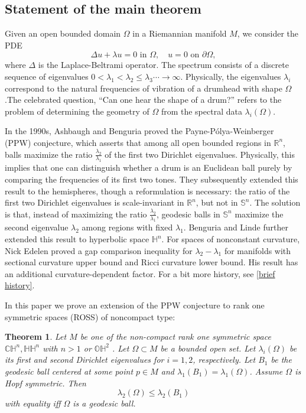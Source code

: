 \documentclass{amsart}
\numberwithin{equation}{section}
\theoremstyle{plain}
\newtheorem{theorem}{Theorem}[section]
\theoremstyle{definition}
\theoremstyle{remark}
\def\RR {\mathbb{R}}
\def\CC {\mathbb{C}}
\def\HH {\mathbb{H}}
\def\OO {\mathbb{O}}
\def\SS {\mathbb{S}}
\begin{document}
\subsection{Statement of the main theorem}
 Given an open bounded domain $\Omega$ in a Riemannian manifold $M$, we consider the PDE \[\Delta u+\lambda u=0 \text { in } \Omega, \quad u=0 \text { on } \partial \Omega,\] where $\Delta$ is the Laplace-Beltrami operator. The spectrum consists of a discrete sequence of eigenvalues $0<\lambda_1<\lambda_2 \leq \lambda_3 \cdots \rightarrow \infty$. Physically, the eigenvalues $\lambda_i$ correspond to the natural frequencies of vibration of a drumhead with shape $\Omega$.The celebrated question, “Can one hear the shape of a drum?” refers to the problem of determining the geometry of $\Omega$ from the spectral data $\lambda_i(\Omega)$.
\par In the 1990s, Ashbaugh and Benguria\cite{ashbaugh1992sharp} proved the Payne-Pólya-Weinberger (PPW) conjecture, which asserts that among all open bounded regions in $\RR^n$, balls maximize the ratio $\frac{\lambda_2}{\lambda_1}$ of the first two Dirichlet eigenvalues. Physically, this implies that one can distinguish whether a drum is an Euclidean ball purely by comparing the frequencies of its first two tones. They subsequently extended this result to the hemispheres\cite{ashbaugh2001sharp}, though a reformulation is necessary: the ratio of the first two Dirichlet eigenvalues is scale-invariant in $\RR^n$, but not in $\SS^n$. The solution is that, instead of maximizing the ratio $\frac{\lambda_2}{\lambda_1}$, geodesic balls in $\SS^n$ maximize the second eigenvalue $\lambda_2$ among regions with fixed $\lambda_1$. Benguria and Linde further extended this result to hyperbolic space $\HH^n$\cite{benguria2007second}. For spaces of nonconstant curvature, Nick Edelen \cite{edelen2017ppw} proved a gap comparison inequality for $\lambda_2-\lambda_1$ for manifolds with sectional curvature upper bound and Ricci curvature lower bound. His result has an additional curvature-dependent factor. For a bit more history, see \cref{brief history}. 
\par In this paper we prove an extension of the PPW conjecture to rank one symmetric spaces (ROSS) of noncompact type:
\begin{theorem}\label{MainTheorem}
    Let $M$ be one of the non-compact rank one symmetric space $\CC\HH^n, \HH\HH^n$ with $n>1$ or $\OO\HH^2$ . Let $\Omega \subset M$ be a bounded open set. Let $\lambda_i(\Omega)$ be its first and second Dirichlet eigenvalues for $i=1,2$, respectively. Let $B_1$ be the geodesic ball centered at some point $p \in M$ and $\lambda_1(B_1)= \lambda_1(\Omega)$. Assume $\Omega$ is Hopf symmetric. Then \[\lambda_2(\Omega) \leq \lambda_2\left(B_1\right)\] with equality iff $\Omega$ is a geodesic ball.
\end{theorem}
\end{document}
